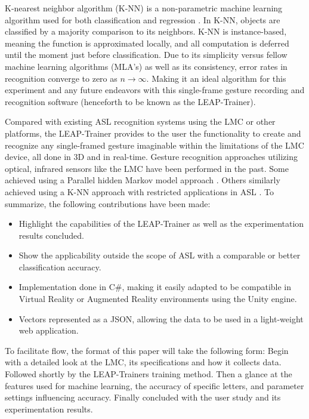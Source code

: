 \documentclass[letterpaper, 10 pt, conference]{ieeeconf}
\begin{document}
K-nearest neighbor algorithm (K-NN) is a non-parametric machine learning algorithm used for both classification and regression \cite{COVER}. In K-NN, objects are classified by a majority comparison to its neighbors. K-NN is instance-based, meaning the function is approximated locally, and all computation is deferred until the moment just before classification. Due to its simplicity versus fellow machine learning algorithms (MLA’s) as well as its consistency, error rates in recognition converge to zero as $n \rightarrow \infty$. Making it an ideal algorithm for this experiment and any future endeavors with this single-frame gesture recording and recognition software (henceforth to be known as the LEAP-Trainer). 

\vspace{5pt}

Compared with existing ASL recognition systems using the LMC or other platforms, the LEAP-Trainer provides to the user the functionality to create and recognize any single-framed gesture imaginable within the limitations of the LMC device, all done in 3D and in real-time. Gesture recognition approaches utilizing optical, infrared sensors like the LMC have been performed in the past. Some achieved using a Parallel hidden Markov model approach \cite{FOK}. Others similarly achieved using a K-NN approach with restricted applications in ASL \cite{COVER}. To summarize, the following contributions have been made: 

\begin{itemize}
\item Highlight the capabilities of the LEAP-Trainer as well as the experimentation results concluded. 
\item Show the applicability outside the scope of ASL with a comparable or better classification accuracy. 
\item Implementation done in C\#, making it easily adapted to be compatible in Virtual Reality or Augmented Reality environments using the Unity engine.
\item Vectors represented as a JSON, allowing the data to be used in a light-weight web application.
\end{itemize}
\vspace{5pt}

To facilitate flow, the format of this paper will take the following form: Begin with a detailed look at the LMC, its specifications and how it collects data. Followed shortly by the LEAP-Trainers training method. Then a glance at the features used for machine learning, the accuracy of specific letters, and parameter settings influencing accuracy. Finally concluded with the user study and its experimentation results.
\end{document}
